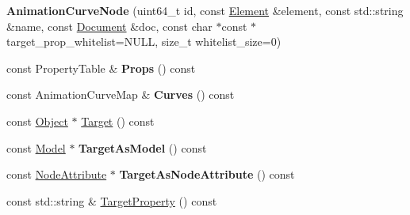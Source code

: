 \begin{DoxyCompactItemize}
\item 
\hypertarget{class_assimp_1_1_f_b_x_1_1_animation_curve_node_abd537d88d88838f480e85131eac58154}{{\bfseries Animation\+Curve\+Node} (uint64\+\_\+t id, const \hyperlink{class_assimp_1_1_f_b_x_1_1_element}{Element} \&element, const std\+::string \&name, const \hyperlink{class_assimp_1_1_f_b_x_1_1_document}{Document} \&doc, const char $\ast$const $\ast$target\+\_\+prop\+\_\+whitelist=N\+U\+L\+L, size\+\_\+t whitelist\+\_\+size=0)}\label{class_assimp_1_1_f_b_x_1_1_animation_curve_node_abd537d88d88838f480e85131eac58154}

\item 
\hypertarget{class_assimp_1_1_f_b_x_1_1_animation_curve_node_a099aef3e04f22c42a7e29d1fb696f75a}{const Property\+Table \& {\bfseries Props} () const }\label{class_assimp_1_1_f_b_x_1_1_animation_curve_node_a099aef3e04f22c42a7e29d1fb696f75a}

\item 
\hypertarget{class_assimp_1_1_f_b_x_1_1_animation_curve_node_ad1465505a0e6c61240eb7f299c8c0f17}{const Animation\+Curve\+Map \& {\bfseries Curves} () const }\label{class_assimp_1_1_f_b_x_1_1_animation_curve_node_ad1465505a0e6c61240eb7f299c8c0f17}

\item 
const \hyperlink{class_assimp_1_1_f_b_x_1_1_object}{Object} $\ast$ \hyperlink{class_assimp_1_1_f_b_x_1_1_animation_curve_node_ac44f7f4b71b68fd98fec1247c2bd2141}{Target} () const 
\item 
\hypertarget{class_assimp_1_1_f_b_x_1_1_animation_curve_node_ab8ef8727a1aeb46dc8c8e7d556f94874}{const \hyperlink{class_assimp_1_1_f_b_x_1_1_model}{Model} $\ast$ {\bfseries Target\+As\+Model} () const }\label{class_assimp_1_1_f_b_x_1_1_animation_curve_node_ab8ef8727a1aeb46dc8c8e7d556f94874}

\item 
\hypertarget{class_assimp_1_1_f_b_x_1_1_animation_curve_node_af1b714d3e52b4bee12c10a681032bd25}{const \hyperlink{class_assimp_1_1_f_b_x_1_1_node_attribute}{Node\+Attribute} $\ast$ {\bfseries Target\+As\+Node\+Attribute} () const }\label{class_assimp_1_1_f_b_x_1_1_animation_curve_node_af1b714d3e52b4bee12c10a681032bd25}

\item 
const std\+::string \& \hyperlink{class_assimp_1_1_f_b_x_1_1_animation_curve_node_ad3d8252f477cc8915969d2f56db0266f}{Target\+Property} () const 
\end{DoxyCompactItemize}
